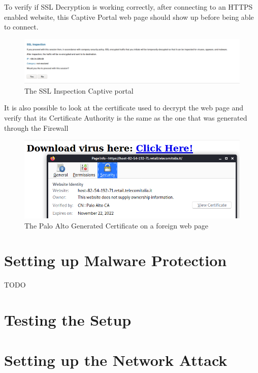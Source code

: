 \documentclass[status=normal,cover=tesi,language=en]{gmeepd}
\begin{document}
\pagebreak

To verify if SSL Decryption is working correctly, after connecting to an HTTPS enabled website, this Captive Portal web page should show up before being able to connect.

\begin{figure}[!h]
\centering
 \includegraphics[width=13cm]{img/ssl_inspection_result.png}
	\caption{The SSL Inspection Captive portal }\label{SSL Inspection Page}
\end{figure}

It is also possible to look at the certificate used to decrypt the web page and verify that its Certificate Authority is the same as the one that was generated through the Firewall

\begin{figure}[h!]
 \centering
 \includegraphics[width=13cm]{img/pa_certificate.png}
 \caption{The Palo Alto Generated Certificate on a foreign web page}
 \label{fig: PaloAlto certificate}
\end{figure}


\pagebreak

\section{Setting up Malware Protection}

TODO

\section{Testing the Setup}

\pagebreak

\section{Setting up the Network Attack}
\end{document}
